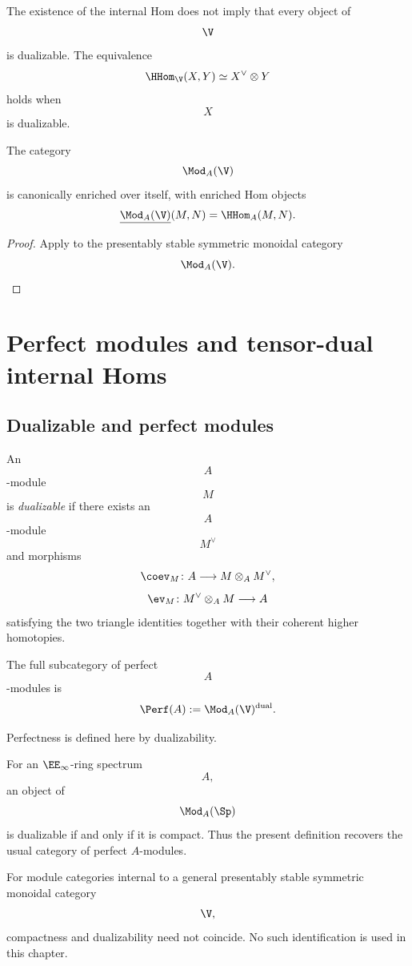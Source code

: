 \begin{remark}
\label{rem:closed-not-rigid}
The existence of the internal Hom does not imply that every object of
\[
    \V
\]
is dualizable. The equivalence
\[
    \HHom_{\V}(X,Y)
    \simeq
    X^\vee\otimes Y
\]
holds when
\[
    X
\]
is dualizable.
\end{remark}

\begin{proposition}
\label{prop:module-self-enrichment}
The category
\[
    \Mod_A(\V)
\]
is canonically enriched over itself, with enriched Hom objects
\[
    \underline{\Mod_A(\V)}(M,N)
    =
    \HHom_A(M,N).
\]
\end{proposition}

\begin{proof}
Apply
to the presentably stable symmetric monoidal category
\[
    \Mod_A(\V).
\]
\end{proof}

\section{Perfect modules and tensor-dual internal Homs}
\label{sec:quasi-coherent-perfect}


\subsection{Dualizable and perfect modules}

\begin{definition}
\label{def:dualizable-module}
An
\[
    A
\]
-module
\[
    M
\]
is \emph{dualizable} if there exists an
\[
    A
\]
-module
\[
    M^\vee
\]
and morphisms
\[
    \coev_M
    \colon
    A
    \longrightarrow
    M\otimes_A M^\vee,
\]
\[
    \ev_M
    \colon
    M^\vee\otimes_A M
    \longrightarrow
    A
\]
satisfying the two triangle identities together with their coherent
higher homotopies.
\end{definition}

\begin{definition}
\label{def:perfect-module}
The full subcategory of perfect
\[
    A
\]
-modules is
\[
    \Perf(A)
    :=
    \Mod_A(\V)^{\mathrm{dual}}.
\]
\end{definition}

\begin{remark}
\label{rem:perfect-versus-compact}
Perfectness is defined here by dualizability.

For an $\EE_\infty$-ring spectrum
\[
    A,
\]
an object of
\[
    \Mod_A(\Sp)
\]
is dualizable if and only if it is compact. Thus the present definition
recovers the usual category of perfect $A$-modules.

For module categories internal to a general presentably stable symmetric
monoidal category
\[
    \V,
\]
compactness and dualizability need not coincide. No such identification is
used in this chapter.
\end{remark}


